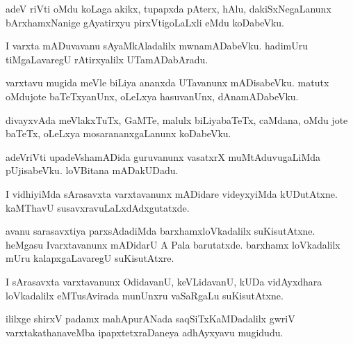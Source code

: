 \documentclass{article}
\begin{document}
\begin{mn}
adeV riVti  oMdu  koLaga  akikx,  tupapxda  pAterx,  hAlu,  dakiSxNegaLanunx  bArxhamxNanige  gAyatirxyu  pirxVtigoLaLxli  eMdu  koDabeVku.
\end{mn}

\begin{mn}
I  varxta  mADuvavanu  sAyaMkAladalilx  mwnamADabeVku.  hadimUru  tiMgaLavaregU  rAtirxyalilx  UTamADabAradu.
\end{mn}

\begin{mn}
varxtavu  mugida  meVle  biLiya  ananxda  UTavanunx  mADisabeVku.  matutx  oMdujote  baTeTxyanUnx,  oLeLxya  hasuvanUnx,  dAnamADabeVku.
\end{mn}

\begin{mn}
divayxvAda  meVlakxTuTx,  GaMTe,  malulx  biLiyabaTeTx,  caMdana,  oMdu jote  baTeTx,  oLeLxya  mosarananxgaLanunx  koDabeVku.
\end{mn}

\begin{mn}
adeVriVti  upadeVshamADida  guruvanunx  vasatxrX  muMtAduvugaLiMda  pUjisabeVku.  loVBitana  mADakUDadu.
\end{mn}

\begin{mn}
I  vidhiyiMda  sArasavxta varxtavanunx  mADidare  videyxyiMda  kUDutAtxne.  kaMThavU  susavxravuLaLxdAdxgutatxde.
\end{mn}

\begin{mn}
avanu  sarasavxtiya  parxsAdadiMda  barxhamxloVkadalilx  suKisutAtxne.  heMgasu  Ivarxtavanunx  mADidarU  A  Pala  
barutatxde.  barxhamx  loVkadalilx  mUru  kalapxgaLavaregU  suKisutAtxre.
\end{mn}

\begin{mn}
I  sArasavxta varxtavanunx  OdidavanU,  keVLidavanU,  kUDa  vidAyxdhara loVkadalilx  eMTusAvirada  munUnxru  vaSaRgaLu  suKisutAtxne.  
\end{mn}

\begin{mn}
ililxge  shirxV  padamx mahApurANada  saqSiTxKaMDadalilx  gwriV varxtakathanaveMba  ipapxtetxraDaneya  adhAyxyavu  mugidudu.
\end{mn}


\end{document}

